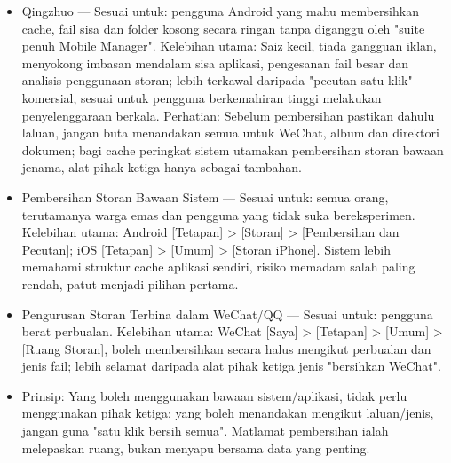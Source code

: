 
\begin{itemize}
  \item Qingzhuo — Sesuai untuk: pengguna Android yang mahu membersihkan cache, fail sisa dan folder kosong secara ringan tanpa diganggu oleh "suite penuh Mobile Manager". Kelebihan utama: Saiz kecil, tiada gangguan iklan, menyokong imbasan mendalam sisa aplikasi, pengesanan fail besar dan analisis penggunaan storan; lebih terkawal daripada "pecutan satu klik" komersial, sesuai untuk pengguna berkemahiran tinggi melakukan penyelenggaraan berkala. Perhatian: Sebelum pembersihan pastikan dahulu laluan, jangan buta menandakan semua untuk WeChat, album dan direktori dokumen; bagi cache peringkat sistem utamakan pembersihan storan bawaan jenama, alat pihak ketiga hanya sebagai tambahan.
  \item Pembersihan Storan Bawaan Sistem — Sesuai untuk: semua orang, terutamanya warga emas dan pengguna yang tidak suka bereksperimen. Kelebihan utama: Android [Tetapan] > [Storan] > [Pembersihan dan Pecutan]; iOS [Tetapan] > [Umum] > [Storan iPhone]. Sistem lebih memahami struktur cache aplikasi sendiri, risiko memadam salah paling rendah, patut menjadi pilihan pertama.
  \item Pengurusan Storan Terbina dalam WeChat/QQ — Sesuai untuk: pengguna berat perbualan. Kelebihan utama: WeChat [Saya] > [Tetapan] > [Umum] > [Ruang Storan], boleh membersihkan secara halus mengikut perbualan dan jenis fail; lebih selamat daripada alat pihak ketiga jenis "bersihkan WeChat".
  \item Prinsip: Yang boleh menggunakan bawaan sistem/aplikasi, tidak perlu menggunakan pihak ketiga; yang boleh menandakan mengikut laluan/jenis, jangan guna "satu klik bersih semua". Matlamat pembersihan ialah melepaskan ruang, bukan menyapu bersama data yang penting.
\end{itemize}


